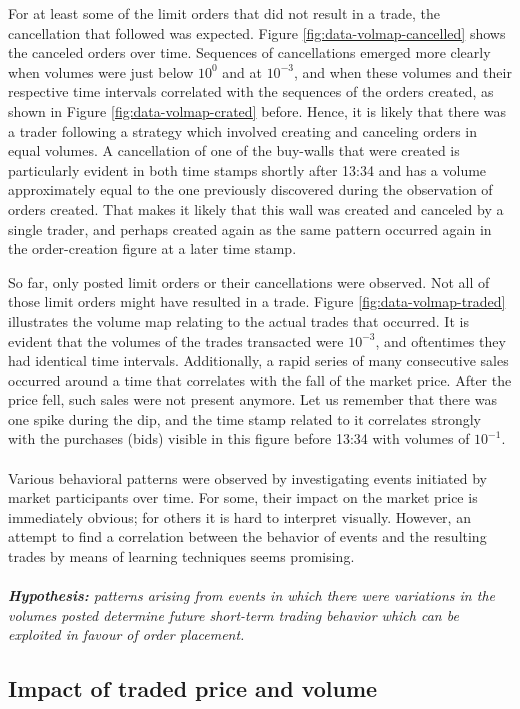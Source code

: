 For at least some of the limit orders that did not result in a trade, the cancellation that followed was expected.
Figure \ref{fig:data-volmap-cancelled} shows the canceled orders over time.
Sequences of cancellations emerged more clearly when volumes were just below $10^0$ and at $10^{-3}$, and when these volumes and their respective time intervals correlated with the sequences of the orders created, as shown in Figure \ref{fig:data-volmap-crated} before.
Hence, it is likely that there was a trader following a strategy which involved creating and canceling orders in equal volumes.
A cancellation of one of the buy-walls that were created is particularly evident in both time stamps shortly after 13:34 and has a volume approximately equal to the one previously discovered during the observation of orders created.
That makes it likely that this wall was created and canceled by a single trader, and perhaps created again as the same pattern occurred again in the order-creation figure at a later time stamp.

So far, only posted limit orders or their cancellations were observed.
Not all of those limit orders might have resulted in a trade. Figure \ref{fig:data-volmap-traded} illustrates the volume map relating to the actual trades that occurred.
It is evident that the volumes of the trades transacted were $10^{-3}$, and oftentimes they had identical time intervals.
Additionally, a rapid series of many consecutive sales occurred around a time that correlates with the fall of the market price.
After the price fell, such sales were not present anymore.
Let us remember that there was one spike during the dip, and the time stamp related to it correlates strongly with the purchases (bids) visible in this figure before 13:34 with volumes of $10^{-1}$.
\\
\\
Various behavioral patterns were observed by investigating events initiated by market participants over time.
For some, their impact on the market price is immediately obvious; for others it is hard to interpret visually.
However, an attempt to find a correlation between the behavior of events and the resulting trades by means of learning techniques seems promising.
\\
\\
\textit{\textbf{Hypothesis:} patterns arising from events in which there were variations in the volumes posted determine future short-term trading behavior which can be exploited in favour of order placement.}

\subsection{Impact of traded price and volume}
\label{sec:data-hypthesis-trade-price-volume}

